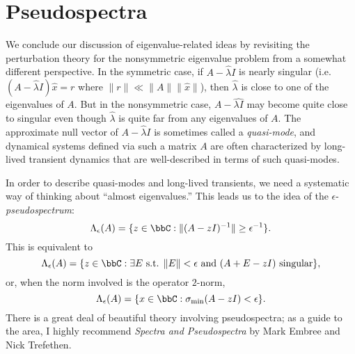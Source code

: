 \documentclass[12pt, leqno]{article} %
\begin{document}
\section{Pseudospectra}

We conclude our discussion of eigenvalue-related ideas by revisiting the
perturbation theory for the nonsymmetric eigenvalue problem from a
somewhat different perspective.  In the symmetric case, if $A-\hat{\lambda} I$
is nearly singular (i.e. $(A-\hat{\lambda} I) \hat{x} = r$ where
$\|r\| \ll \|A\|\|\hat{x}\|$), then $\hat{\lambda}$ is close to one of the
eigenvalues of $A$.  But in the nonsymmetric case, $A-\hat{\lambda I}$ may
become quite close to singular even though $\hat{\lambda}$ is quite far
from any eigenvalues of $A$.  The approximate null vector of $A-\hat{\lambda} I$
is sometimes called a {\em quasi-mode}, and dynamical systems defined via
such a matrix $A$ are often characterized by long-lived transient dynamics
that are well-described in terms of such quasi-modes.

In order to describe quasi-modes and long-lived transients, we need a
systematic way of thinking about ``almost eigenvalues.''  This leads
us to the idea of the $\epsilon$-{\em pseudospectrum}:
\[
  \Lambda_{\epsilon}(A) = \{z \in \bbC : \|(A-zI)^{-1}\| \geq \epsilon^{-1}\}.
\]
This is equivalent to
\[
  \Lambda_{\epsilon}(A) = \{ z \in \bbC : \exists E \mbox{ s.t. } \|E\| < \epsilon \mbox{ and }(A+E-zI) \mbox{ singular} \},
\]
or, when the norm involved is the operator $2$-norm,
\[
  \Lambda_{\epsilon}(A) = \{ x \in \bbC : \sigma_{\min}(A-zI) < \epsilon \}.
\]
There is a great deal of beautiful theory involving pseudospectra; as a
guide to the area, I highly recommend {\em Spectra and Pseudospectra}
by Mark Embree and Nick Trefethen.
\end{document}
